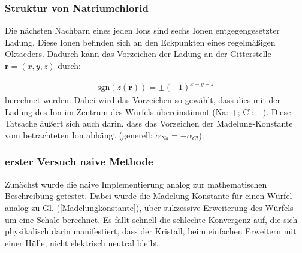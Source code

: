 \documentclass[10pt,a4paper]{article}
\begin{document}
\subsubsection{Struktur von Natriumchlorid}

Die nächsten Nachbarn eines jeden Ions sind sechs Ionen entgegengesetzter
Ladung. Diese Ionen befinden sich an den Eckpunkten eines regelmäßigen
Oktaeders. Dadurch kann das Vorzeichen der Ladung an der Gitterstelle
$\mathbf{r} = \left( x,y,z \right)$ durch:

\begin{align}
\mathrm{sgn}\left(z(\mathbf{r})\right) = \pm \left( -1 \right)^{x+y+z}
\end{align}
berechnet werden. Dabei wird das Vorzeichen so gewählt, dass dies mit der Ladung
des Ion im Zentrum des Würfels übereinstimmt (Na: $+$; Cl: $-$). Diese Tatsache
äußert sich auch darin, dass das Vorzeichen der Madelung-Konstante vom
betrachteten Ion abhängt (generell: $\alpha_{Na} = - \alpha_{Cl}$).
\subsubsection{erster Versuch naive Methode}

Zunächst wurde die naive Implementierung analog zur mathematischen Beschreibung
getestet. Dabei wurde die Madelung-Konstante für einen Würfel analog zu
Gl. (\ref{Madelungkonstante}), über sukzessive Erweiterung des Würfels um eine
Schale berechnet. Es fällt schnell die schlechte Konvergenz auf, die sich
physikalisch darin manifestiert, dass der Kristall, beim einfachen Erweitern
mit einer Hülle, nicht elektrisch neutral bleibt.
\end{document}
